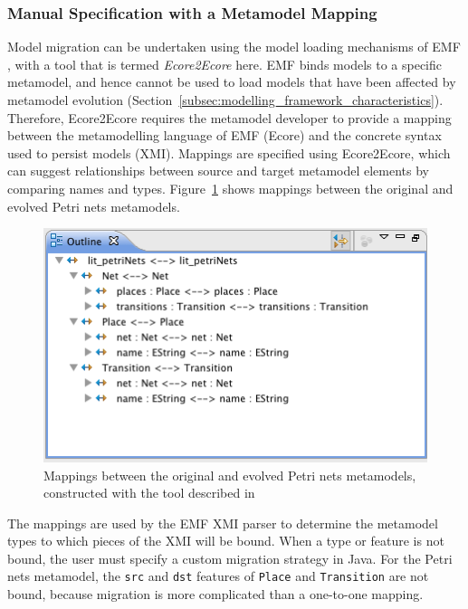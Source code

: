 \subsubsection{Manual Specification with a Metamodel Mapping}
\label{subsubsec:ecore2ecore}
Model migration can be undertaken using the model loading mechanisms of EMF \cite{hussey06advanced}, with a tool that is termed \emph{Ecore2Ecore} here. EMF binds models to a specific metamodel, and hence cannot be used to load models that have been affected by metamodel evolution (Section~\ref{subsec:modelling_framework_characteristics}). Therefore, Ecore2Ecore requires the metamodel developer to provide a mapping between the metamodelling language of EMF (Ecore) and the concrete syntax used to persist models (XMI). Mappings are specified using Ecore2Ecore, which can suggest relationships between source and target metamodel elements by comparing names and types. Figure~\ref{fig:petri_nets_ecore2ecore} shows mappings between the original and evolved Petri nets metamodels.

\begin{figure}[htb]
	\centering
		\includegraphics[scale=0.75]{5.Implementation/images/petri_nets_ecore2ecore.png}
	\caption[Mappings between the original and evolved Petri nets metamodels]{Mappings between the original and evolved Petri nets metamodels, constructed with the tool described in \cite{hussey06advanced}}
	\label{fig:petri_nets_ecore2ecore}
\end{figure}


The mappings are used by the EMF XMI parser to determine the metamodel types to which pieces of the XMI will be bound. When a type or feature is not bound, the user must specify a custom migration strategy in Java. For the Petri nets metamodel, the \texttt{src} and \texttt{dst} features of \texttt{Place} and \texttt{Transition} are not bound, because migration is more complicated than a one-to-one mapping.

